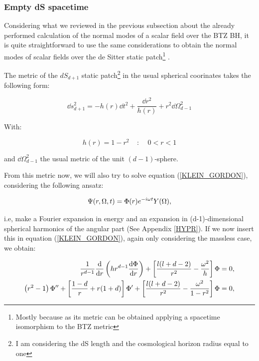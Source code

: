 \documentclass[11pt,a4paper]{article}
\begin{document}
{\subsubsection{Empty dS spacetime}

Considering what we reviewed in the previous subsection about the already performed calculation of the normal modes of a scalar field over the BTZ BH, it is quite straightforward to use the same considerations to obtain the normal modes of scalar fields over the de Sitter static patch\footnote{Mostly because as its metric can be obtained applying a spacetime isomorphism to the BTZ metric} \cite{Anninos_2012} .

The metric of the $dS_{d+1}$ static patch\footnote{I am considering the dS length and the cosmological horizon radius equal to one} in the usual spherical coorinates takes the following form:

\begin{equation}
    \dd s^2_{d+1} = -h(r)\dd t^2 + \frac{\dd r^2}{h(r)}+r^2\dd\Omega_{d-1}^2
\end{equation}

{\noindent With:}

\begin{equation}
    h(r) = 1 - r^2 ~~~~~:~~~~~ 0 < r < 1
\end{equation}

{\noindent and $\dd\Omega^2_{d-1}$ the usual metric of the unit $(d-1)$-sphere.}

From this metric now, we will also try to solve equation (\ref{KLEIN_GORDON}), considering the following ansatz:

\begin{equation}
    \Psi(r,\Omega,t) = \Phi(r)e^{-i\omega t}Y(\Omega),
\end{equation}

{\noindent i.e, make a Fourier expansion in energy and an expansion in (d-1)-dimensional spherical harmonics of the angular part (See Appendix \ref{HYPR}). If we now insert this in equation (\ref{KLEIN_GORDON}), again only considering the massless case, we obtain:}

\begin{equation}
    \begin{aligned}
        \frac{1}{r^{d-1}}\frac{\mathrm{d}}{\mathrm{d} r}\left(hr^{d-1}\frac{\mathrm{d}\Phi}{\mathrm{d} r}\right) +\left[\frac{l(l+d-2)}{r^2}-\frac{\omega^2}{h}\right]\Phi &= 0,\\
        \left(r^2-1\right)\Phi''+\left[\frac{1-d}{r}+r(1+d)\right]\Phi'+\left[\frac{l(l+d-2)}{r^2}-\frac{\omega^2}{1-r^2}\right]\Phi &= 0,
    \end{aligned}
\end{equation}

}
\end{document}
